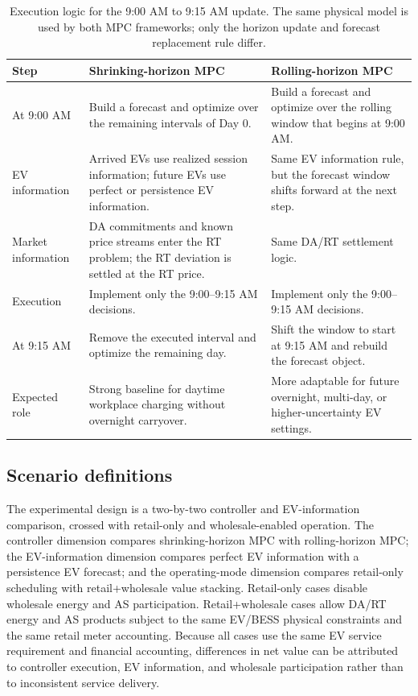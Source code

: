 \documentclass[final,5p,times]{elsarticle}
\begin{document}
\begin{table}[!t]
\centering
\caption{Execution logic for the 9:00 AM to 9:15 AM update. The same physical model is used by both MPC frameworks; only the horizon update and forecast replacement rule differ.}
\label{tab:execution_example}
\scriptsize
\begin{tabularx}{\textwidth}{@{}p{}X X@{}}
\toprule
Step & Shrinking-horizon MPC & Rolling-horizon MPC \\
\midrule
At 9:00 AM & Build a forecast and optimize over the remaining intervals of Day 0. & Build a forecast and optimize over the rolling window that begins at 9:00 AM.\\
EV information & Arrived EVs use realized session information; future EVs use perfect or persistence EV information. & Same EV information rule, but the forecast window shifts forward at the next step.\\
Market information & DA commitments and known price streams enter the RT problem; the RT deviation is settled at the RT price. & Same DA/RT settlement logic.\\
Execution & Implement only the 9:00--9:15 AM decisions. & Implement only the 9:00--9:15 AM decisions.\\
At 9:15 AM & Remove the executed interval and optimize the remaining day. & Shift the window to start at 9:15 AM and rebuild the forecast object.\\
Expected role & Strong baseline for daytime workplace charging without overnight carryover. & More adaptable for future overnight, multi-day, or higher-uncertainty EV settings.\\
\bottomrule
\end{tabularx}
\end{table}

\subsection{Scenario definitions}
The experimental design is a two-by-two controller and EV-information comparison, crossed with retail-only and wholesale-enabled operation. The controller dimension compares shrinking-horizon MPC with rolling-horizon MPC; the EV-information dimension compares perfect EV information with a persistence EV forecast; and the operating-mode dimension compares retail-only scheduling with retail+wholesale value stacking. Retail-only cases disable wholesale energy and AS participation. Retail+wholesale cases allow DA/RT energy and AS products subject to the same EV/BESS physical constraints and the same retail meter accounting. Because all cases use the same EV service requirement and financial accounting, differences in net value can be attributed to controller execution, EV information, and wholesale participation rather than to inconsistent service delivery.
\end{document}
